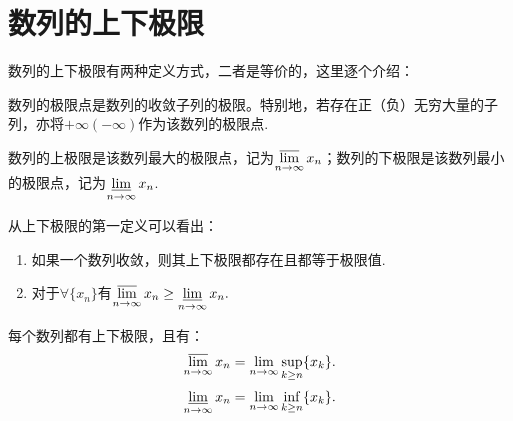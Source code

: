 \section{数列的上下极限}

数列的上下极限有两种定义方式，二者是等价的，这里逐个介绍：

\begin{definition}[极限点]
	数列的极限点是数列的收敛子列的极限。特别地，若存在正（负）无穷大量的子列，亦将$+\infty(-\infty)$作为该数列的极限点.
\end{definition}

\begin{definition}[第一定义]
	数列的上极限是该数列最大的极限点，记为$\displaystyle\varlimsup_{n\to\infty}x_n$；数列的下极限是该数列最小的极限点，记为$\displaystyle\varliminf_{n\to\infty}x_n$.
\end{definition}

从上下极限的第一定义可以看出：

\begin{enumerate}
	\item 如果一个数列收敛，则其上下极限都存在且都等于极限值.
	\item 对于$\forall\{x_n\}$有$\displaystyle\varlimsup_{n\to\infty}x_n\geq\displaystyle\varliminf_{n\to\infty}x_n.$
\end{enumerate}

\begin{definition}[第二定义]
	每个数列都有上下极限，且有：
	\begin{equation}
		\displaystyle\varlimsup_{n\to\infty}x_n=\displaystyle\lim_{n\to\infty}\sup_{k\geq n}\{x_k\}.
	\end{equation}
	\begin{equation}
		\displaystyle\varliminf_{n\to\infty}x_n=\displaystyle\lim_{n\to\infty}\inf_{k\geq n}\{x_k\}.
	\end{equation}
\end{definition}